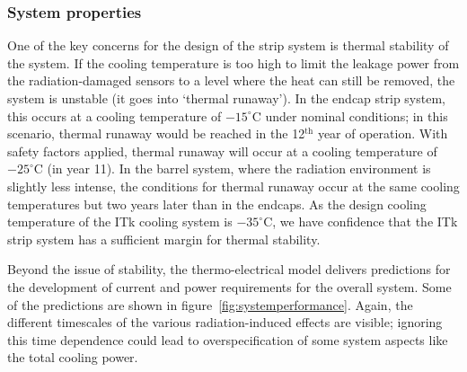 \subsubsection{System properties}
One of the key concerns for the design of the strip system is thermal stability of the system. If the cooling temperature is too high to limit the leakage power from the radiation-damaged sensors to a level where the heat can still be removed, the system is unstable (it goes into `thermal runaway').
In the endcap strip system, this occurs at a cooling temperature of $-15^\circ$C under nominal conditions; in this scenario, thermal runaway would be reached in the 12$^\text{th}$ year of operation. With safety factors applied, thermal runaway will occur at a cooling temperature of $-25^\circ$C (in year 11).
In the barrel system, where the radiation environment is slightly less intense, the conditions for thermal runaway occur at the same cooling temperatures but two years later than in the endcaps.
As the design cooling temperature of the ITk cooling system is $-35^\circ$C, we have confidence that the ITk strip system has a sufficient margin for thermal stability.

Beyond the issue of stability, the thermo-electrical model delivers predictions for the development of current and power requirements for the overall system. Some of the predictions are shown in figure~\ref{fig:systemperformance}. Again, the different timescales of the various radiation-induced effects are visible; ignoring this time dependence could lead to overspecification of some system aspects like the total cooling power.

